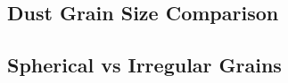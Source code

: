 


























\subsection{Dust Grain Size Comparison}





\subsection{Spherical vs Irregular Grains}





